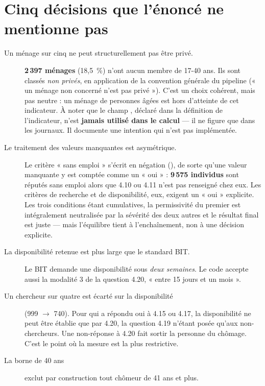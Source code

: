 \documentclass[11pt,a4paper]{article}
\begin{document}
\section{Cinq décisions que l'énoncé ne mentionne pas}

\begin{description}
  \item[Un ménage sur cinq ne peut structurellement pas être privé.] \textbf{2\,397 ménages}
  (18,5~\%) n'ont aucun membre de 17-40 ans. Ils sont classés \emph{non privés}, en application de
  la convention générale du pipeline (« un ménage non concerné n'est pas privé »). C'est un choix
  cohérent, mais pas neutre : un ménage de personnes âgées est hors d'atteinte de cet indicateur.
  À noter que le champ , déclaré dans la définition de
  l'indicateur, n'est \textbf{jamais utilisé dans le calcul} --- il ne figure que dans les
  journaux. Il documente une intention qui n'est pas implémentée.

  \item[Le traitement des valeurs manquantes est asymétrique.] Le critère « sans emploi » s'écrit
  en négation (), de sorte qu'une valeur manquante y est comptée comme un « oui » :
  \textbf{9\,575 individus} sont réputés sans emploi alors que 4.10 ou 4.11 n'est pas renseigné
  chez eux. Les critères de recherche et de disponibilité, eux, exigent un « oui » explicite. Les
  trois conditions étant cumulatives, la permissivité du premier est intégralement neutralisée par
  la sévérité des deux autres et le résultat final est juste --- mais l'équilibre tient à
  l'enchaînement, non à une décision explicite.

  \item[La disponibilité retenue est plus large que le standard BIT.] Le BIT demande une
  disponibilité sous \emph{deux semaines}. Le code accepte aussi la modalité 3 de la question 4.20,
  « entre 15 jours et un mois ».

  \item[Un chercheur sur quatre est écarté sur la disponibilité] (999 $\rightarrow$ 740). Pour qui
  a répondu oui à 4.15 ou 4.17, la disponibilité ne peut être établie que par 4.20, la question
  4.19 n'étant posée qu'aux non-chercheurs. Une non-réponse à 4.20 fait sortir la personne du
  chômage. C'est le point où la mesure est la plus restrictive.

  \item[La borne de 40 ans] exclut par construction tout chômeur de 41 ans et plus.
\end{description}
\end{document}
